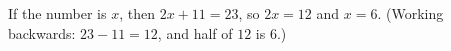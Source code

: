 If the number is $x$, then $2x+11=23$, so $2x=12$ and $x=\boxed{6}$. (Working backwards: $23-11=12$, and half of $12$ is $6$.)
